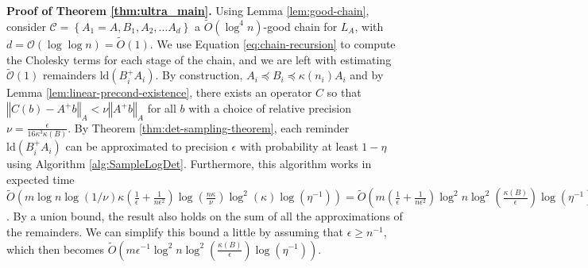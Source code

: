 \textbf{Proof of Theorem \ref{thm:ultra_main}.} Using Lemma \ref{lem:good-chain},
consider $\mathcal{C}=\left\{ A_{1}=A,B_{1},A_{2},\dots A_{d}\right\} $
a $\tilde{O}\left(\log^{4}n\right)$-good chain for $L_{A}$, with
$d=\mathcal{O}\left(\log\log n\right)=\tilde{O}\left(1\right)$. We
use Equation \ref{eq:chain-recursion} to compute the Cholesky terms
for each stage of the chain, and we are left with estimating $\tilde{\mathcal{O}}\left(1\right)$
remainders $\text{ld}\left(B_{i}^{+}A_{i}\right)$. By construction,
$A_{i}\preceq B_{i}\preceq\kappa\left(n_{i}\right)A_{i}$ and by Lemma
\ref{lem:linear-precond-existence}, there exists an operator $C$
so that $\left\Vert C\left(b\right)-A^{+}b\right\Vert _{A}<\nu\left\Vert A^{+}b\right\Vert _{A}$
for all $b$ with a choice of relative precision $\nu=\frac{\epsilon}{16\kappa^{3}\kappa\left(B\right)}$.
By Theorem \ref{thm:det-sampling-theorem}, each reminder $\text{ld}\left(B_{i}^{+}A_{i}\right)$
can be approximated to precision $\epsilon$ with probability at least
$1-\eta$ using Algorithm \ref{alg:SampleLogDet}.
Furthermore, this algorithm works in expected time $\tilde{O}\left(m\log n\log\left(1/\nu\right)\kappa\left(\frac{1}{\epsilon}+\frac{1}{n\epsilon^{2}}\right)\log\left(\frac{n\kappa}{\nu}\right)\log^{2}\left(\kappa\right)\log\left(\eta^{-1}\right)\right)=\tilde{O}\left(m\left(\frac{1}{\epsilon}+\frac{1}{n\epsilon^{2}}\right)\log^{2}n\log^{2}\left(\frac{\kappa\left(B\right)}{\epsilon}\right)\log\left(\eta^{-1}\right)\right)$.
By a union bound, the result also holds on the sum of all the approximations
of the remainders. We can simplify this bound a little by assuming
that $\epsilon\geq n^{-1}$, which then becomes $\tilde{O}\left(m\epsilon^{-1}\log^{2}n\log^{2}\left(\frac{\kappa\left(B\right)}{\epsilon}\right)\log\left(\eta^{-1}\right)\right)$. 
